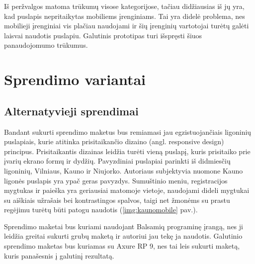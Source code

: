 \documentclass{VUMIFPSkursinis}
\begin{document}
Iš peržvalgos matoma trūkumų visose kategorijose, tačiau didžiausias iš jų yra, kad puslapis nepritaikytas mobiliems įrenginiams. Tai yra didelė problema, nes mobilieji įrenginiai vis plačiau naudojami \cite{EmergingmHealthEn} ir šių įrenginių vartotojai turėtų galėti laisvai naudotis puslapiu. Galutinis prototipas turi išspręsti šiuos panaudojomumo trūkumus.


\section{Sprendimo variantai}

\subsection{Alternatyvieji sprendimai}
Bandant sukurti sprendimo maketus bus remiamasi jau egzistuojančiais ligoninių puslapiais, kurie atitinka prisitaikančio dizaino (angl. responsive design) principus. Prisitaikantis dizainas leidžia turėti vieną puslapį, kuris prisitaiko prie įvarių ekrano formų ir dydžių\cite{RWDEn}. Pavyzdiniai puslapiai parinkti iš didmiesčių ligoninių, Vilniaus, Kauno ir Niujorko. Autoriaus subjektyvia nuomone Kauno ligonės puslapis yra ypač geras pavyzdys. Sumuštinio meniu, registracijos mygtukas ir paieška yra geriausiai matomoje vietoje, naudojami dideli mygtukai su aiškiais užrašais bei kontrastingos spalvos, taigi net žmonėms su prastu regėjimu turėtų būti patogu naudotis (\ref{img:kaunomobile} pav.).

Sprendimo maketai bus kuriami naudojant Balsamiq programinę įrangą, nes ji leidžia greitai sukurti grubų maketą ir autoriui jau tekę ja naudotis. Galutinio sprendimo maketas bus kuriamas su Axure RP 9, nes tai leis sukurti maketą, kuris panašesnis į galutinį rezultatą.
\end{document}
